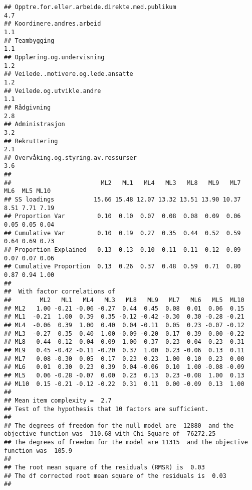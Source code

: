 \documentclass[
]{article}
\begin{document}
\begin{verbatim}
## Opptre.for.eller.arbeide.direkte.med.publikum                                    4.7
## Koordinere.andres.arbeid                                                         1.1
## Teambygging                                                                      1.1
## Opplæring.og.undervisning                                                        1.2
## Veilede..motivere.og.lede.ansatte                                                1.2
## Veilede.og.utvikle.andre                                                         1.1
## Rådgivning                                                                       2.8
## Administrasjon                                                                   3.2
## Rekruttering                                                                     2.1
## Overvåking.og.styring.av.ressurser                                               3.6
## 
##                         ML2   ML1   ML4   ML3   ML8   ML9   ML7  ML6  ML5 ML10
## SS loadings           15.66 15.48 12.07 13.32 13.51 13.90 10.37 8.51 7.71 7.19
## Proportion Var         0.10  0.10  0.07  0.08  0.08  0.09  0.06 0.05 0.05 0.04
## Cumulative Var         0.10  0.19  0.27  0.35  0.44  0.52  0.59 0.64 0.69 0.73
## Proportion Explained   0.13  0.13  0.10  0.11  0.11  0.12  0.09 0.07 0.07 0.06
## Cumulative Proportion  0.13  0.26  0.37  0.48  0.59  0.71  0.80 0.87 0.94 1.00
## 
##  With factor correlations of 
##        ML2   ML1   ML4   ML3   ML8   ML9   ML7   ML6   ML5  ML10
## ML2   1.00 -0.21 -0.06 -0.27  0.44  0.45  0.08  0.01  0.06  0.15
## ML1  -0.21  1.00  0.39  0.35 -0.12 -0.42 -0.30  0.30 -0.28 -0.21
## ML4  -0.06  0.39  1.00  0.40  0.04 -0.11  0.05  0.23 -0.07 -0.12
## ML3  -0.27  0.35  0.40  1.00 -0.09 -0.20  0.17  0.39  0.00 -0.22
## ML8   0.44 -0.12  0.04 -0.09  1.00  0.37  0.23  0.04  0.23  0.31
## ML9   0.45 -0.42 -0.11 -0.20  0.37  1.00  0.23 -0.06  0.13  0.11
## ML7   0.08 -0.30  0.05  0.17  0.23  0.23  1.00  0.10  0.23  0.00
## ML6   0.01  0.30  0.23  0.39  0.04 -0.06  0.10  1.00 -0.08 -0.09
## ML5   0.06 -0.28 -0.07  0.00  0.23  0.13  0.23 -0.08  1.00  0.13
## ML10  0.15 -0.21 -0.12 -0.22  0.31  0.11  0.00 -0.09  0.13  1.00
## 
## Mean item complexity =  2.7
## Test of the hypothesis that 10 factors are sufficient.
## 
## The degrees of freedom for the null model are  12880  and the objective function was  310.68 with Chi Square of  76272.25
## The degrees of freedom for the model are 11315  and the objective function was  105.9 
## 
## The root mean square of the residuals (RMSR) is  0.03 
## The df corrected root mean square of the residuals is  0.03 
## 

\end{verbatim}
\end{document}
